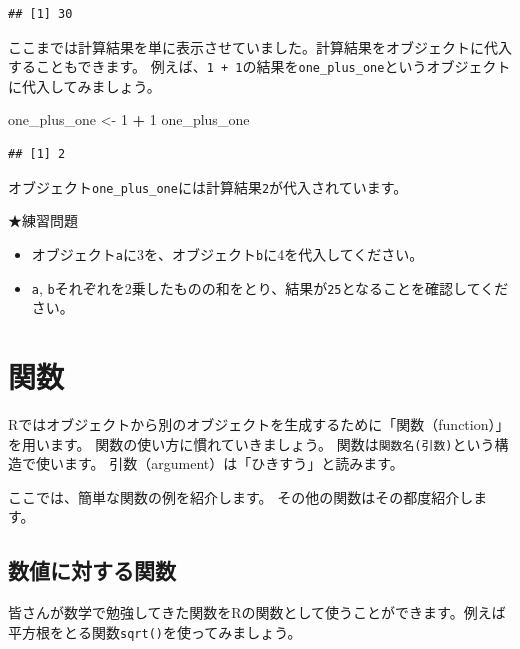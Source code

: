 \documentclass[]{book}
\newenvironment{Shaded}{\begin{snugshade}}{\end{snugshade}}
\newcommand{\DecValTok}[1]{\textcolor[rgb]{0.00,0.00,0.81}{#1}}
\newcommand{\StringTok}[1]{\textcolor[rgb]{0.31,0.60,0.02}{#1}}
\newcommand{\OperatorTok}[1]{\textcolor[rgb]{0.81,0.36,0.00}{\textbf{#1}}}
\newcommand{\NormalTok}[1]{#1}
\providecommand{\tightlist}{%
  \setlength{\itemsep}{0pt}\setlength{\parskip}{0pt}}
\begin{document}
\begin{verbatim}
## [1] 30
\end{verbatim}

ここまでは計算結果を単に表示させていました。計算結果をオブジェクトに代入することもできます。
例えば、\texttt{1\ +\ 1}の結果を\texttt{one\_plus\_one}というオブジェクトに代入してみましょう。

\begin{Shaded}
\begin{Highlighting}[]
\NormalTok{one_plus_one <-}\StringTok{ }\DecValTok{1} \OperatorTok{+}\StringTok{ }\DecValTok{1}
\NormalTok{one_plus_one}
\end{Highlighting}
\end{Shaded}

\begin{verbatim}
## [1] 2
\end{verbatim}

オブジェクト\texttt{one\_plus\_one}には計算結果\texttt{2}が代入されています。

★練習問題

\begin{itemize}
\tightlist
\item
  オブジェクト\texttt{a}に3を、オブジェクト\texttt{b}に4を代入してください。
\item
  \texttt{a},
  \texttt{b}それぞれを2乗したものの和をとり、結果が\texttt{25}となることを確認してください。
\end{itemize}

\section{関数}\label{ux95a2ux6570}

Rではオブジェクトから別のオブジェクトを生成するために「関数（function）」を用います。
関数の使い方に慣れていきましょう。
関数は\texttt{関数名(引数)}という構造で使います。
引数（argument）は「ひきすう」と読みます。

ここでは、簡単な関数の例を紹介します。
その他の関数はその都度紹介します。

\subsection{数値に対する関数}\label{ux6570ux5024ux306bux5bfeux3059ux308bux95a2ux6570}

皆さんが数学で勉強してきた関数をRの関数として使うことができます。例えば平方根をとる関数\texttt{sqrt()}を使ってみましょう。
\end{document}
